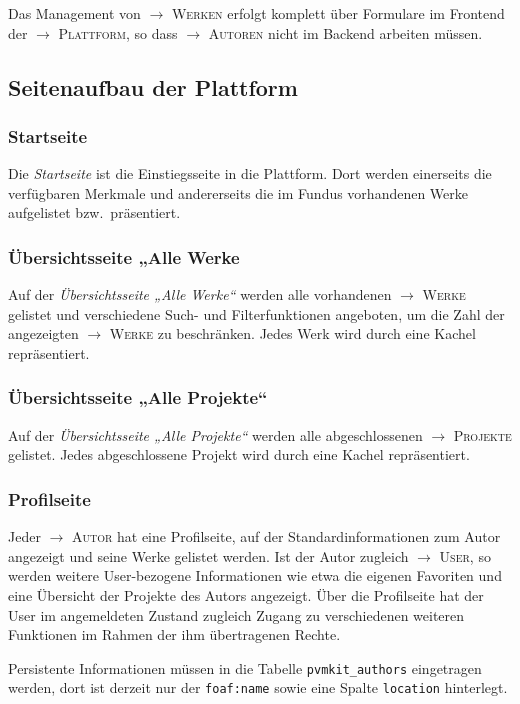 \documentclass[a4paper,11pt]{article}
\newcommand{\glossar}[1]{{$\to$ \textsc{#1}}}
\begin{document}
Das Management von \glossar{Werken} erfolgt komplett über Formulare im Frontend
der \glossar{Plattform}, so dass \glossar{Autoren} nicht im Backend arbeiten
müssen.

\subsection{Seitenaufbau der Plattform}

\subsubsection{Startseite}

Die \emph{Startseite} ist die Einstiegsseite in die Plattform.  Dort werden
einerseits die verfügbaren Merkmale und andererseits die im Fundus vorhandenen
Werke aufgelistet bzw.\ präsentiert.

\subsubsection{Übersichtsseite „Alle Werke}
Auf der \emph{Übersichtsseite „Alle Werke“} werden alle vorhandenen
\glossar{Werke} gelistet und verschiedene Such- und Filterfunktionen
angeboten, um die Zahl der angezeigten \glossar{Werke} zu beschränken.  Jedes
Werk wird durch eine Kachel repräsentiert.

\subsubsection{Übersichtsseite „Alle Projekte“}
Auf der \emph{Übersichtsseite „Alle Projekte“} werden alle abgeschlossenen
\glossar{Projekte} gelistet.  Jedes abgeschlossene Projekt wird durch eine
Kachel repräsentiert.

\subsubsection{Profilseite}
Jeder \glossar{Autor} hat eine Profilseite, auf der Standardinformationen zum
Autor angezeigt und seine Werke gelistet werden. Ist der Autor zugleich
\glossar{User}, so werden weitere User-bezogene Informationen wie etwa die
eigenen Favoriten und eine Übersicht der Projekte des Autors angezeigt. Über
die Profilseite hat der User im angemeldeten Zustand zugleich Zugang zu
verschiedenen weiteren Funktionen im Rahmen der ihm übertragenen Rechte.

Persistente Informationen müssen in die Tabelle \texttt{pvmkit\_authors}
eingetragen werden, dort ist derzeit nur der \texttt{foaf:name} sowie eine
Spalte \texttt{location} hinterlegt.
\end{document}
